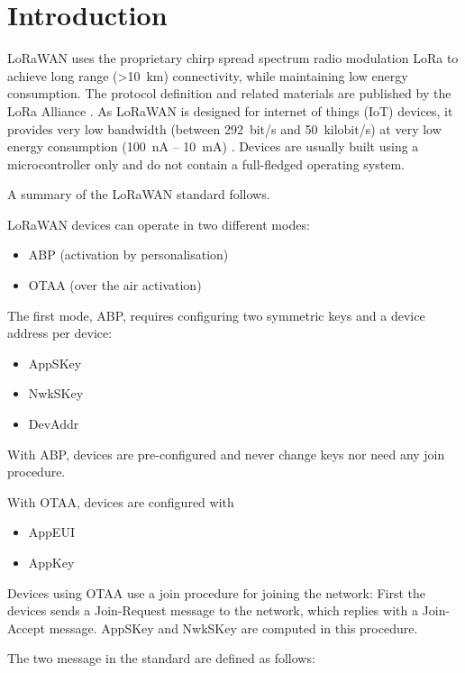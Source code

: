 \chapter{Introduction}

LoRaWAN uses the proprietary chirp spread spectrum radio modulation
LoRa to achieve long range (\textgreater{}10~km) connectivity, while
maintaining low energy consumption. The protocol definition and related materials are published by the LoRa Alliance \cite{spec}.
As LoRaWAN is designed for internet of things (IoT)
devices, it provides very low bandwidth (between 292~bit/s and 50~kilobit/s) at very low energy consumption (100~nA -- 10~mA) \cite{wiki_de_lorawan}. Devices are
usually built using a microcontroller only and do not contain a
full-fledged operating system.

A summary of the LoRaWAN standard \cite{spec} follows.

LoRaWAN devices can operate in two different modes:

\begin{itemize}
\tightlist
\item
  {ABP (activation by personalisation)}
\item
  {OTAA (over the air activation)}
\end{itemize}

{The first mode, ABP, requires configuring two symmetric keys and a
device address per device:}

\begin{itemize}
\tightlist
\item
  {AppSKey}
\item
  {NwkSKey}
\item
  {DevAddr}
\end{itemize}

{With ABP, devices are pre-configured and never change keys nor need any
join procedure.}


{With OTAA, devices are configured with}

\begin{itemize}
\tightlist
\item
  {AppEUI}
\item
  {AppKey}
\end{itemize}

{Devices using OTAA use a join procedure for joining the network: First
the devices sends a Join-Request message to the network, which replies
with a Join-Accept message. AppSKey and NwkSKey are computed in this
procedure.}

{The two message in the standard are defined as follows:}

